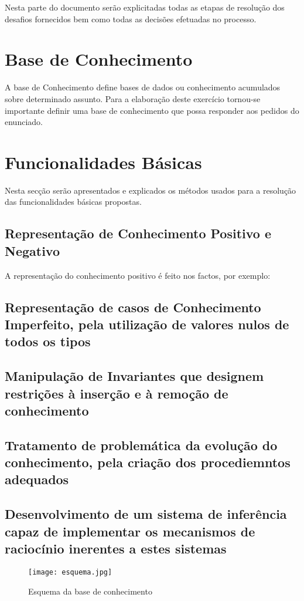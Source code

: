 Nesta parte do documento serão explicitadas todas as etapas de resolução dos desafios fornecidos bem como todas as decisões efetuadas no processo.


\section{Base de Conhecimento}
\label{p3:baseConhe}

A base de Conhecimento define bases de dados ou conhecimento acumulados sobre determinado assunto.
Para a elaboração deste exercício tornou-se importante definir uma base de conhecimento
que possa responder aos pedidos do enunciado.

\section{Funcionalidades Básicas}
\label{p3:funcbasic}
Nesta secção serão apresentados e explicados os métodos usados para a resolução das funcionalidades básicas propostas.

\subsection{Representação de Conhecimento Positivo e Negativo}

A representação do conhecimento positivo é feito nos factos, por exemplo:


\subsection{Representação de casos de Conhecimento Imperfeito, pela utilização de valores nulos de todos os tipos}



\subsection{Manipulação de Invariantes que designem restrições à inserção e à remoção de conhecimento}


\subsection{Tratamento de problemática da evolução do conhecimento, pela criação dos procediemntos adequados}


\subsection{Desenvolvimento de um sistema de inferência capaz de implementar os mecanismos de raciocínio inerentes a estes sistemas}

\begin{figure}[<+htpb+>]
	\centering
	\texttt{[image: esquema.jpg]}
	\caption{Esquema da base de conhecimento }
	\label{p3:fig:esquema1}
\end{figure}



